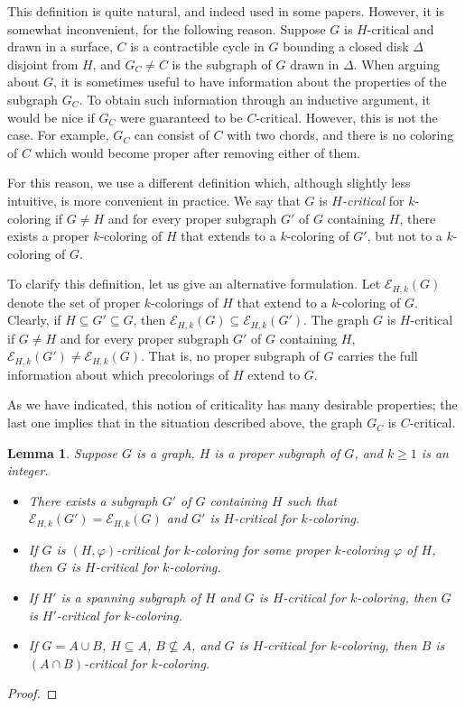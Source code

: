 \documentclass[12pt,twoside,openright,a4paper]{book}
\newtheorem{lemma}[theorem]{Lemma}
\newcommand{\EE}{\mathcal{E}}
\begin{document}
This definition is quite natural, and indeed used in some papers.  However, it is somewhat inconvenient,
for the following reason.  Suppose $G$ is $H$-critical and drawn in a surface, $C$ is a contractible cycle
in $G$ bounding a closed disk $\Delta$ disjoint from $H$, and $G_C\neq C$ is the subgraph of $G$ drawn in $\Delta$.
When arguing about $G$, it is sometimes useful to have information about the properties of the subgraph $G_C$.
To obtain such information through an inductive argument, it would be nice if $G_C$ were guaranteed to be $C$-critical.
However, this is not the case.  For example, $G_C$ can consist of $C$ with two chords, and there is no coloring of $C$
which would become proper after removing either of them.

For this reason, we use a different definition which, although slightly less intuitive, is more convenient in practice.
We say that $G$ is \emph{$H$-critical} for $k$-coloring if $G\neq H$ and for every proper subgraph $G'$ of $G$ containing $H$,
there exists a proper $k$-coloring of $H$ that extends to a $k$-coloring of $G'$, but not to a $k$-coloring of $G$.

To clarify this definition, let us give an alternative formulation.  Let $\EE_{H,k}(G)$ denote the set of proper $k$-colorings of
$H$ that extend to a $k$-coloring of $G$.  Clearly, if $H\subseteq G'\subseteq G$, then $\EE_{H,k}(G)\subseteq \EE_{H,k}(G')$.
The graph $G$ is $H$-critical if $G\neq H$ and for every proper subgraph $G'$ of $G$ containing $H$, $\EE_{H,k}(G')\neq\EE_{H,k}(G)$.
That is, no proper subgraph of $G$ carries the full information about which precolorings of $H$ extend to $G$.

As we have indicated, this notion of criticality has many desirable properties; the last one implies that in the
situation described above, the graph $G_C$ is $C$-critical.
\begin{lemma}\label{lemma:critsgprop}
Suppose $G$ is a graph, $H$ is a proper subgraph of $G$, and $k\ge 1$ is an integer.
\begin{itemize}
\item There exists a subgraph $G'$ of $G$ containing $H$ such that $\EE_{H,k}(G')=\EE_{H,k}(G)$
and $G'$ is $H$-critical for $k$-coloring.
\item If $G$ is $(H,\varphi)$-critical for $k$-coloring for some proper $k$-coloring $\varphi$ of $H$,
then $G$ is $H$-critical for $k$-coloring.
\item If $H'$ is a spanning subgraph of $H$ and $G$ is $H$-critical for $k$-coloring, then $G$ is
$H'$-critical for $k$-coloring.
\item If $G=A\cup B$, $H\subseteq A$, $B\not\subseteq A$, and $G$ is $H$-critical for $k$-coloring,
then $B$ is $(A\cap B)$-critical for $k$-coloring.
\end{itemize}
\end{lemma}
\begin{proof}
\end{proof}
\end{document}
